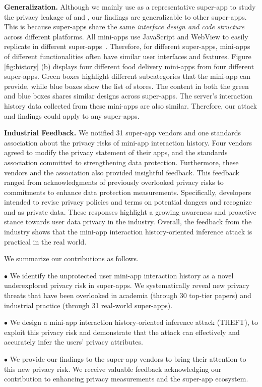 \noindent \textbf{Generalization.}
Although we mainly use \alipay as a representative super-app to study the
privacy leakage of \mini and \op, our findings are generalizable to
other super-apps. This is because super-apps share
the same \textit{interface design and code structure} across different platforms. 
All mini-apps use JavaScript and WebView to easily replicate in different
super-apps~\cite{li2023minitracker,wang2023taintmini,zhang2022identity}.
Therefore, for different super-apps, mini-apps of different functionalities
often have similar user interfaces and features. Figure \ref{fig:history} (b)
displays four different food delivery mini-apps from four different super-apps.
Green boxes highlight different subcategories that the mini-app can
provide, while blue boxes show the list of stores. The content in both the green
and blue boxes shares similar designs across super-apps. The server's interaction history data collected from these mini-apps are also similar. Therefore,
our attack and findings could apply to any super-apps. 




\noindent \textbf{Industrial Feedback.}
We notified 31 super-app vendors and one standards association about the privacy risks of mini-app interaction history. Four vendors agreed to modify the privacy statement of their apps, and the standards association committed to strengthening data protection. Furthermore, these vendors and the association also provided insightful feedback. This feedback ranged from acknowledgments of previously overlooked privacy risks to commitments to enhance data protection measurements. Specifically, developers intended to revise privacy policies and terms on potential dangers and recognize \mini and \op as private data. These responses highlight a growing awareness and proactive stance towards user data privacy in the industry. Overall, the feedback from the industry shows that the mini-app interaction history-oriented inference attack is practical in the real world.


We summarize our contributions as follows.


$\bullet$ We identify the unprotected user mini-app interaction history as a novel underexplored privacy risk in super-apps. We systematically reveal new privacy threats that have been overlooked in academia (through 30 top-tier papers) and industrial practice (through 31 real-world super-apps). 

\vspace{-0.2em}
$\bullet$ We design a mini-app interaction history-oriented inference attack (THEFT), to exploit this privacy risk and demonstrate that the attack can effectively and accurately infer the users' privacy attributes.

\vspace{-0.2em}
$\bullet$ We provide our findings to the super-app vendors to bring their attention to this new privacy risk. We receive valuable feedback acknowledging our contribution to enhancing privacy measurements and the super-app ecosystem.

\vspace{-0.2em}


